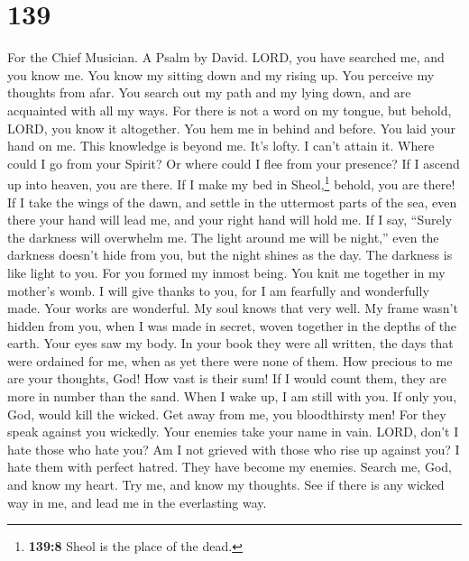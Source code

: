 \hypertarget{section-131}{%
\section{139}\label{section-131}}

For the Chief Musician. A Psalm by David.  LORD, you have
searched me, and you know me.  You know my sitting down
and my rising up. You perceive my thoughts from afar.  You
search out my path and my lying down, and are acquainted with all my
ways.  For there is not a word on my tongue, but behold,
LORD, you know it altogether.  You hem me in behind and
before. You laid your hand on me.  This knowledge is
beyond me. It's lofty. I can't attain it.  Where could I
go from your Spirit? Or where could I flee from your presence?
 If I ascend up into heaven, you are there. If I make my
bed in Sheol,\footnote{\textbf{139:8} Sheol is the place of the dead.}
behold, you are there!  If I take the wings of the dawn,
and settle in the uttermost parts of the sea,  even there
your hand will lead me, and your right hand will hold me.
 If I say, ``Surely the darkness will overwhelm me. The
light around me will be night,''  even the darkness
doesn't hide from you, but the night shines as the day. The darkness is
like light to you.  For you formed my inmost being. You
knit me together in my mother's womb.  I will give thanks
to you, for I am fearfully and wonderfully made. Your works are
wonderful. My soul knows that very well.  My frame wasn't
hidden from you, when I was made in secret, woven together in the depths
of the earth.  Your eyes saw my body. In your book they
were all written, the days that were ordained for me, when as yet there
were none of them.  How precious to me are your thoughts,
God! How vast is their sum!  If I would count them, they
are more in number than the sand. When I wake up, I am still with you.
 If only you, God, would kill the wicked. Get away from
me, you bloodthirsty men!  For they speak against you
wickedly. Your enemies take your name in vain.  LORD,
don't I hate those who hate you? Am I not grieved with those who rise up
against you?  I hate them with perfect hatred. They have
become my enemies.  Search me, God, and know my heart.
Try me, and know my thoughts.  See if there is any wicked
way in me, and lead me in the everlasting way.

